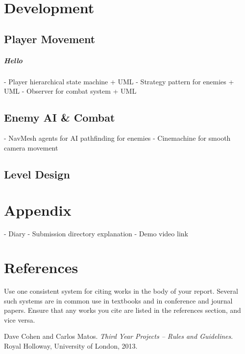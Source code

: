 \documentclass[]{final_report}
\begin{document}
\chapter{Development}
\section{Player Movement}
\paragraph{Hello}
- Player hierarchical state machine + UML \newline
- Strategy pattern for enemies + UML \newline
- Observer for combat system + UML \newline
\section{Enemy AI \& Combat}
- NavMesh agents for AI pathfinding for enemies \newline
- Cinemachine for smooth camera movement \newline
\section{Level Design}

\chapter{Appendix}
- Diary \newline
- Submission directory explanation \newline
- Demo video link\newline
\chapter{References}

Use one consistent system for citing works in the body of your report. Several such systems are in common use in textbooks and in conference and journal papers. Ensure that any works you cite are listed in the references section, and vice versa. 

\newpage
\begin{thebibliography}{99}
 Dave Cohen and Carlos Matos. \emph{Third Year Projects -- Rules and Guidelines}. Royal Holloway, University of London, 2013.
\end{thebibliography}
\label{endpage}
\end{document}
